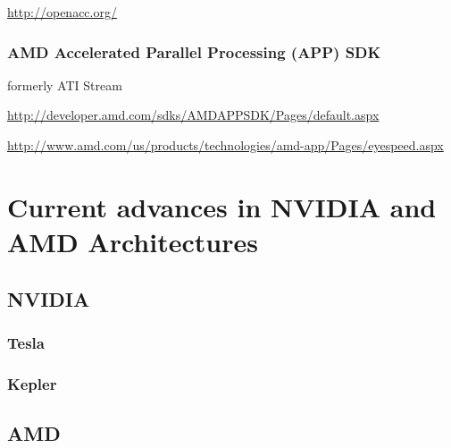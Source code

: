 \hyperref[OpenACC]{http://openacc.org/}

\subsubsection{AMD Accelerated Parallel Processing (APP) SDK}
formerly ATI Stream

\hyperref[AMD 1]{http://developer.amd.com/sdks/AMDAPPSDK/Pages/default.aspx}

\hyperref[AMD 2]{http://www.amd.com/us/products/technologies/amd-app/Pages/eyespeed.aspx}

\section{Current advances in NVIDIA and AMD Architectures}
\subsection{NVIDIA}
\subsubsection{Tesla}
\subsubsection{Kepler}

\subsection{AMD}
